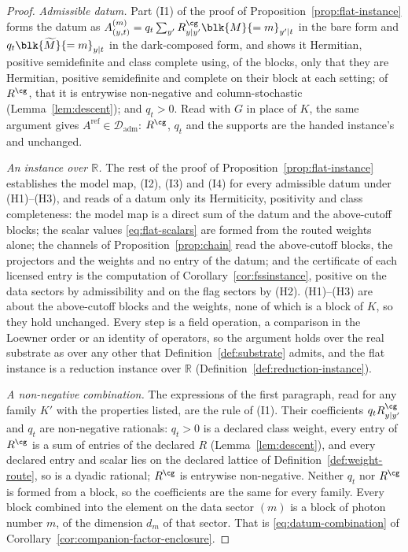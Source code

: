\begin{proof}
\emph{Admissible datum.} Part (I1) of the proof of
Proposition~\ref{prop:flat-instance} forms the datum as
$A^{(m)}_{(y,t)}=q_t\sum_{y'}R^{\cg}_{y|y'}\blk{M}{=m}_{y'|t}$ in the bare
form and $q_t\blk{\widetilde M}{=m}_{y|t}$ in the dark-composed form, and
shows it Hermitian, positive semidefinite and class complete using, of the
blocks, only that they are Hermitian, positive semidefinite and complete on
their block at each setting; of $R^{\cg}$, that it is entrywise non-negative
and column-stochastic (Lemma~\ref{lem:descent}); and $q_t>0$. Read with $G$
in place of $K$, the same argument gives
$A^{\mathrm{ref}}\in\mathcal{D}_{\mathrm{adm}}$: $R^{\cg}$, $q_t$ and the
supports are the handed instance's and unchanged.

\emph{An instance over $\mathbb{R}$.} The rest of the proof of
Proposition~\ref{prop:flat-instance} establishes the model map, (I2), (I3)
and (I4) for every admissible datum under (H1)--(H3), and reads of a datum
only its Hermiticity, positivity and class completeness: the model map is a
direct sum of the datum and the above-cutoff blocks; the scalar values
\eqref{eq:flat-scalars} are formed from the routed weights alone; the
channels of Proposition~\ref{prop:chain} read the above-cutoff blocks, the
projectors and the weights and no entry of the datum; and the certificate of
each licensed entry is the computation of
Corollary~\ref{cor:fssinstance}, positive on the data sectors by
admissibility and on the flag sectors by (H2). (H1)--(H3) are about the
above-cutoff blocks and the weights, none of which is a block of $K$, so
they hold unchanged. Every step is a field operation, a comparison in the
Loewner order or an identity of operators, so the argument holds over the
real substrate as over any other that
Definition~\ref{def:substrate} admits, and the flat instance is a
reduction instance over $\mathbb{R}$ (Definition~\ref{def:reduction-instance}).

\emph{A non-negative combination.} The expressions of the first paragraph,
read for any family $K'$ with the properties listed, are the rule of (I1).
Their coefficients $q_tR^{\cg}_{y|y'}$ and $q_t$ are non-negative rationals:
$q_t>0$ is a declared class weight, every entry of $R^{\cg}$ is a sum of
entries of the declared $R$ (Lemma~\ref{lem:descent}), and every declared
entry and scalar lies on the declared lattice of
Definition~\ref{def:weight-route}, so is a dyadic rational; $R^{\cg}$ is
entrywise non-negative. Neither $q_t$ nor $R^{\cg}$ is formed from a block,
so the coefficients are the same for every family. Every block combined into
the element on the data sector $(m)$ is a block of photon number $m$, of the
dimension $d_m$ of that sector. That is \eqref{eq:datum-combination} of
Corollary~\ref{cor:companion-factor-enclosure}.


\end{proof}
